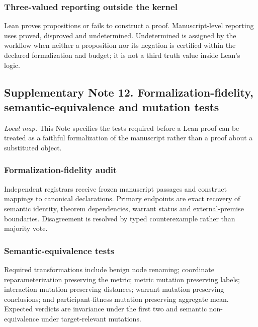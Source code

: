 \hypertarget{three-valued-reporting-outside-the-kernel}{%
\subsubsection{Three-valued reporting outside the
kernel}\label{three-valued-reporting-outside-the-kernel}}

Lean proves propositions or fails to construct a proof. Manuscript-level
reporting uses proved, disproved and undetermined. Undetermined is
assigned by the workflow when neither a proposition nor its negation is
certified within the declared formalization and budget; it is not a
third truth value inside Lean's logic.

\hypertarget{supplementary-note-12.-formalization-fidelity-semantic-equivalence-and-mutation-tests}{%
\subsection{Supplementary Note 12. Formalization-fidelity,
semantic-equivalence and mutation
tests}\label{supplementary-note-12.-formalization-fidelity-semantic-equivalence-and-mutation-tests}}

\emph{Local map.} This Note specifies the tests required before a Lean
proof can be treated as a faithful formalization of the manuscript
rather than a proof about a substituted object.

\hypertarget{formalization-fidelity-audit}{%
\subsubsection{Formalization-fidelity
audit}\label{formalization-fidelity-audit}}

Independent registrars receive frozen manuscript passages and construct
mappings to canonical declarations. Primary endpoints are exact recovery
of semantic identity, theorem dependencies, warrant status and
external-premise boundaries. Disagreement is resolved by typed
counterexample rather than majority vote.

\hypertarget{semantic-equivalence-tests}{%
\subsubsection{Semantic-equivalence
tests}\label{semantic-equivalence-tests}}

Required transformations include benign node renaming; coordinate
reparameterization preserving the metric; metric mutation preserving
labels; interaction mutation preserving distances; warrant mutation
preserving conclusions; and participant-fitness mutation preserving
aggregate mean. Expected verdicts are invariance under the first two and
semantic non-equivalence under target-relevant mutations.

